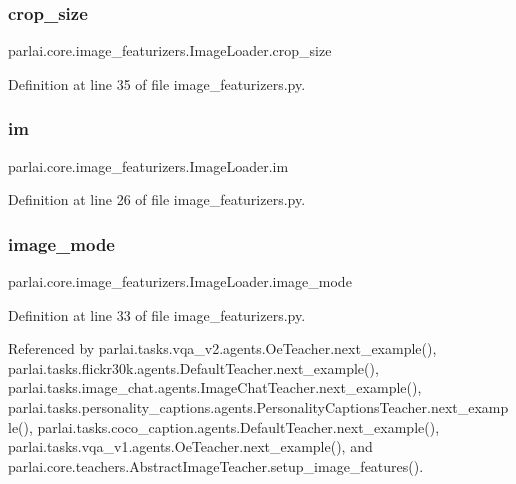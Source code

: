 \subsubsection{\texorpdfstring{crop\+\_\+size}{crop\_size}}
{\footnotesize\ttfamily parlai.\+core.\+image\+\_\+featurizers.\+Image\+Loader.\+crop\+\_\+size}



Definition at line 35 of file image\+\_\+featurizers.\+py.

\mbox{\label{classparlai_1_1core_1_1image__featurizers_1_1ImageLoader_a5a375010eb3a74e13b227d24ba1dbd71}} 
\subsubsection{\texorpdfstring{im}{im}}
{\footnotesize\ttfamily parlai.\+core.\+image\+\_\+featurizers.\+Image\+Loader.\+im}



Definition at line 26 of file image\+\_\+featurizers.\+py.

\mbox{\label{classparlai_1_1core_1_1image__featurizers_1_1ImageLoader_a41a066168f5df273890bc5629b9282bd}} 
\subsubsection{\texorpdfstring{image\+\_\+mode}{image\_mode}}
{\footnotesize\ttfamily parlai.\+core.\+image\+\_\+featurizers.\+Image\+Loader.\+image\+\_\+mode}



Definition at line 33 of file image\+\_\+featurizers.\+py.



Referenced by parlai.\+tasks.\+vqa\+\_\+v2.\+agents.\+Oe\+Teacher.\+next\+\_\+example(), parlai.\+tasks.\+flickr30k.\+agents.\+Default\+Teacher.\+next\+\_\+example(), parlai.\+tasks.\+image\+\_\+chat.\+agents.\+Image\+Chat\+Teacher.\+next\+\_\+example(), parlai.\+tasks.\+personality\+\_\+captions.\+agents.\+Personality\+Captions\+Teacher.\+next\+\_\+example(), parlai.\+tasks.\+coco\+\_\+caption.\+agents.\+Default\+Teacher.\+next\+\_\+example(), parlai.\+tasks.\+vqa\+\_\+v1.\+agents.\+Oe\+Teacher.\+next\+\_\+example(), and parlai.\+core.\+teachers.\+Abstract\+Image\+Teacher.\+setup\+\_\+image\+\_\+features().

